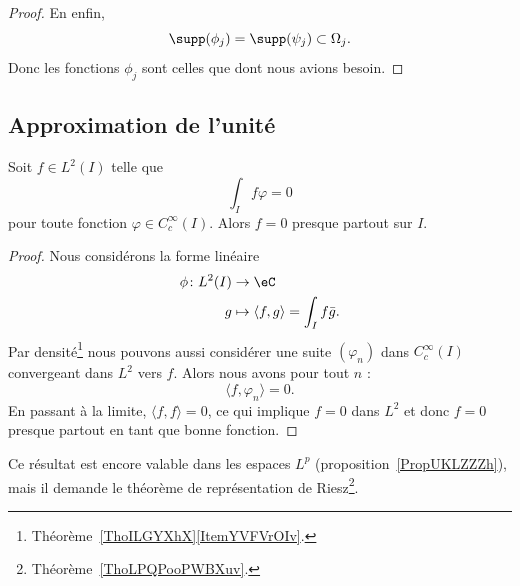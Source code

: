 \begin{proof}
	En enfin,
	\begin{equation}
		\supp(\phi_j)=\supp(\psi_j)\subset\Omega_j.
	\end{equation}
	Donc les fonctions \( \phi_j\) sont celles que dont nous avions besoin.
\end{proof}



\subsection{Approximation de l'unité}


\begin{lemma}       \label{LemDQEKNNf}
	Soit \( f\in L^2(I)\) telle que
	\begin{equation}
		\int_If\varphi=0
	\end{equation}
	pour toute fonction \( \varphi\in C^{\infty}_c(I)\). Alors \( f=0\) presque partout sur \( I\).
\end{lemma}

\begin{proof}
	Nous considérons la forme linéaire
	\begin{equation}
		\begin{aligned}
			\phi\colon L^2(I) & \to \eC                                     \\
			g                 & \mapsto \langle f, g\rangle=\int_If\bar g .
		\end{aligned}
	\end{equation}
	Par densité\footnote{Théorème~\ref{ThoILGYXhX}\ref{ItemYVFVrOIv}.} nous pouvons aussi considérer une suite \( (\varphi_n)\) dans \(  C^{\infty}_c(I)\) convergeant dans \( L^2\) vers \( f\). Alors nous avons pour tout \( n\) :
	\begin{equation}
		\langle f, \varphi_n\rangle =0.
	\end{equation}
	En passant à la limite, \( \langle f, f\rangle =0\), ce qui implique \( f=0\) dans \( L^2\) et donc \( f=0\) presque partout en tant que bonne fonction.
\end{proof}
Ce résultat est encore valable dans les espaces \( L^p\) (proposition~\ref{PropUKLZZZh}), mais il demande le théorème de représentation de Riesz\footnote{Théorème~\ref{ThoLPQPooPWBXuv}.}.

